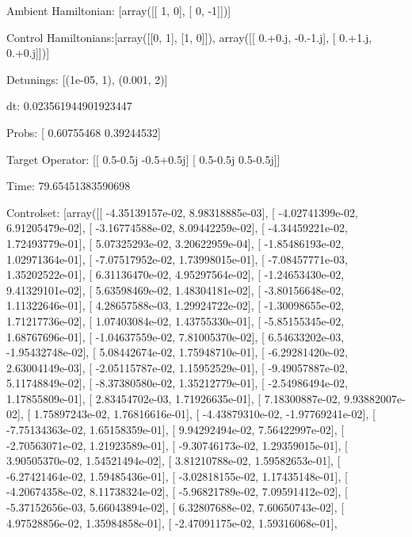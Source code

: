 \documentclass{article}
\begin{document}
    

\newpage

Ambient Hamiltonian: [array([[ 1,  0],
       [ 0, -1]])]

Control Hamiltonians:[array([[0, 1],
       [1, 0]]), array([[ 0.+0.j, -0.-1.j],
       [ 0.+1.j,  0.+0.j]])]

Detunings: [(1e-05, 1), (0.001, 2)]

 dt: 0.023561944901923447

Probs: [ 0.60755468  0.39244532]

Target Operator: [[ 0.5-0.5j -0.5+0.5j]
 [ 0.5-0.5j  0.5-0.5j]]

Time: 79.65451383590698

Controlset: [array([[ -4.35139157e-02,   8.98318885e-03],
       [ -4.02741399e-02,   6.91205479e-02],
       [ -3.16774588e-02,   8.09442259e-02],
       [ -4.34459221e-02,   1.72493779e-01],
       [  5.07325293e-02,   3.20622959e-04],
       [ -1.85486193e-02,   1.02971364e-01],
       [ -7.07517952e-02,   1.73998015e-01],
       [ -7.08457771e-03,   1.35202522e-01],
       [  6.31136470e-02,   4.95297564e-02],
       [ -1.24653430e-02,   9.41329101e-02],
       [  5.63598469e-02,   1.48304181e-02],
       [ -3.80156648e-02,   1.11322646e-01],
       [  4.28657588e-03,   1.29924722e-02],
       [ -1.30098655e-02,   1.71217736e-02],
       [  1.07403084e-02,   1.43755330e-01],
       [ -5.85155345e-02,   1.68767696e-01],
       [ -1.04637559e-02,   7.81005370e-02],
       [  6.54633202e-03,  -1.95432748e-02],
       [  5.08442674e-02,   1.75948710e-01],
       [ -6.29281420e-02,   2.63004149e-03],
       [ -2.05115787e-02,   1.15952529e-01],
       [ -9.49057887e-02,   5.11748849e-02],
       [ -8.37380580e-02,   1.35212779e-01],
       [ -2.54986494e-02,   1.17855809e-01],
       [  2.83454702e-03,   1.71926635e-01],
       [  7.18300887e-02,   9.93882007e-02],
       [  1.75897243e-02,   1.76816616e-01],
       [ -4.43879310e-02,  -1.97769241e-02],
       [ -7.75134363e-02,   1.65158359e-01],
       [  9.94292494e-02,   7.56422997e-02],
       [ -2.70563071e-02,   1.21923589e-01],
       [ -9.30746173e-02,   1.29359015e-01],
       [  3.90505370e-02,   1.54521494e-02],
       [  3.81210788e-02,   1.59582653e-01],
       [ -6.27421464e-02,   1.59485436e-01],
       [ -3.02818155e-02,   1.17435148e-01],
       [ -4.20674358e-02,   8.11738324e-02],
       [ -5.96821789e-02,   7.09591412e-02],
       [ -5.37152656e-03,   5.66043894e-02],
       [  6.32807688e-02,   7.60650743e-02],
       [  4.97528856e-02,   1.35984858e-01],
       [ -2.47091175e-02,   1.59316068e-01],
\end{document}
